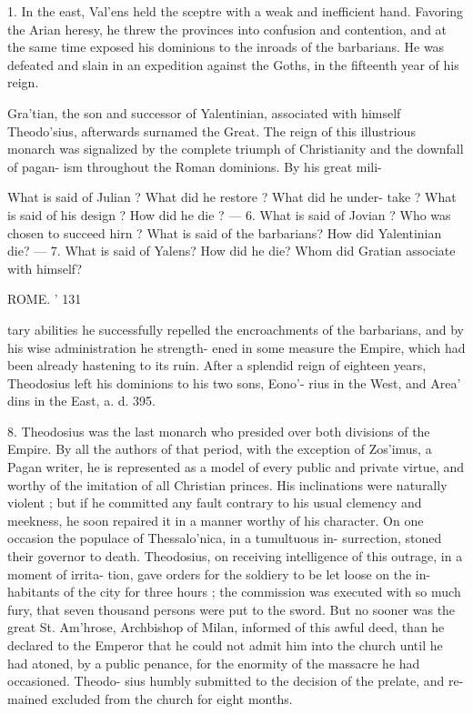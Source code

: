 \documentclass[openany,a4paper]{memoir}
\begin{document}
1. In the east, Val'ens held the sceptre with a weak and 
inefficient hand. Favoring the Arian heresy, he threw the 
provinces into confusion and contention, and at the same 
time exposed his dominions to the inroads of the barbarians. 
He was defeated and slain in an expedition against the Goths, 
in the fifteenth year of his reign. 

Gra'tian, the son and successor of Yalentinian, associated 
with himself Theodo'sius, afterwards surnamed the Great. 
The reign of this illustrious monarch was signalized by the 
complete triumph of Christianity and the downfall of pagan- 
ism throughout the Roman dominions. By his great mili- 

What is said of Julian ? What did he restore ? What did he under- 
take ? What is said of his design ? How did he die ? — 6. What is said 
of Jovian ? Who was chosen to succeed hirn ? What is said of the 
barbarians? How did Yalentinian die? — 7. What is said of Yalens? 
How did he die? Whom did Gratian associate with himself? 



ROME. ' 131 

tary abilities he successfully repelled the encroachments of 
the barbarians, and by his wise administration he strength- 
ened in some measure the Empire, which had been already 
hastening to its ruin. After a splendid reign of eighteen 
years, Theodosius left his dominions to his two sons, Eono'- 
rius in the West, and Area' dins in the East, a. d. 395. 

8. Theodosius was the last monarch who presided over 
both divisions of the Empire. By all the authors of that 
period, with the exception of Zos'imus, a Pagan writer, he 
is represented as a model of every public and private virtue, 
and worthy of the imitation of all Christian princes. His 
inclinations were naturally violent ; but if he committed any 
fault contrary to his usual clemency and meekness, he soon 
repaired it in a manner worthy of his character. On one 
occasion the populace of Thessalo'nica, in a tumultuous in- 
surrection, stoned their governor to death. Theodosius, on 
receiving intelligence of this outrage, in a moment of irrita- 
tion, gave orders for the soldiery to be let loose on the in- 
habitants of the city for three hours ; the commission was 
executed with so much fury, that seven thousand persons 
were put to the sword. But no sooner was the great St. 
Am'hrose, Archbishop of Milan, informed of this awful deed, 
than he declared to the Emperor that he could not admit him 
into the church until he had atoned, by a public penance, for 
the enormity of the massacre he had occasioned. Theodo- 
sius humbly submitted to the decision of the prelate, and re- 
mained excluded from the church for eight months. 
\end{document}
